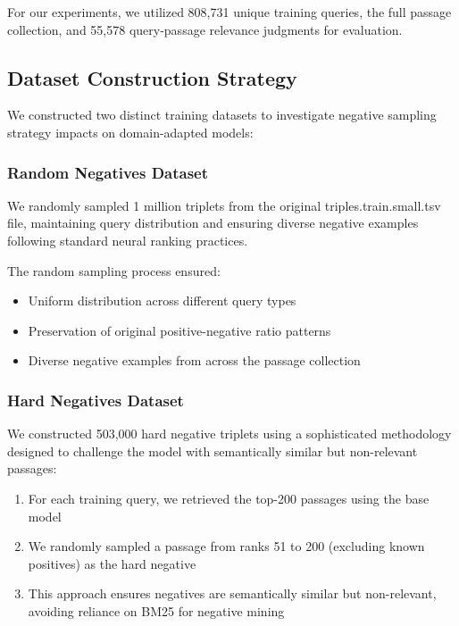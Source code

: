 For our experiments, we utilized 808,731 unique training queries, the full passage collection, and 55,578 query-passage relevance judgments for evaluation.

\subsection{Dataset Construction Strategy}

We constructed two distinct training datasets to investigate negative sampling strategy impacts on domain-adapted models:

\subsubsection{Random Negatives Dataset}
We randomly sampled 1 million triplets from the original triples.train.small.tsv file, maintaining query distribution and ensuring diverse negative examples following standard neural ranking practices.

The random sampling process ensured:
\begin{itemize}
\item Uniform distribution across different query types
\item Preservation of original positive-negative ratio patterns
\item Diverse negative examples from across the passage collection
\end{itemize}

\subsubsection{Hard Negatives Dataset}

We constructed 503,000 hard negative triplets using a sophisticated methodology designed to challenge the model with semantically similar but non-relevant passages:

\begin{enumerate}
\item For each training query, we retrieved the top-200 passages using the base model
\item We randomly sampled a passage from ranks 51 to 200 (excluding known positives) as the hard negative
\item This approach ensures negatives are semantically similar but non-relevant, avoiding reliance on BM25 \cite{robertson2009probabilistic} for negative mining
\end{enumerate}

